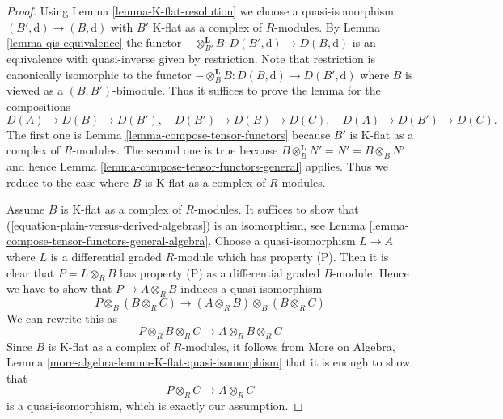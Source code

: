 \begin{proof}
Using Lemma \ref{lemma-K-flat-resolution}
we choose a quasi-isomorphism $(B', \text{d}) \to (B, \text{d})$
with $B'$ K-flat as a complex of $R$-modules.
By Lemma \ref{lemma-qis-equivalence}
the functor $-\otimes^\mathbf{L}_{B'} B : D(B', \text{d}) \to D(B, \text{d})$
is an equivalence with quasi-inverse given by restriction.
Note that restriction is canonically isomorphic to the functor
$- \otimes^\mathbf{L}_B B : D(B, \text{d}) \to D(B', \text{d})$
where $B$ is viewed as a $(B, B')$-bimodule.
Thus it suffices to prove the lemma for the compositions
$$
D(A) \to D(B) \to D(B'),\quad
D(B') \to D(B) \to D(C),\quad
D(A) \to D(B') \to D(C).
$$
The first one is Lemma \ref{lemma-compose-tensor-functors}
because $B'$ is K-flat as a complex of $R$-modules.
The second one is true because
$B \otimes_B^\mathbf{L} N' = N' = B \otimes_B N'$
and hence Lemma \ref{lemma-compose-tensor-functors-general} applies.
Thus we reduce to the case where $B$ is K-flat as a complex
of $R$-modules.

\medskip\noindent
Assume $B$ is K-flat as a complex of $R$-modules. It suffices to
show that (\ref{equation-plain-versus-derived-algebras}) is an
isomorphism, see
Lemma \ref{lemma-compose-tensor-functors-general-algebra}.
Choose a quasi-isomorphism $L \to A$ where $L$ is a differential
graded $R$-module which has property (P). Then it is clear that
$P = L \otimes_R B$ has property (P) as a differential graded $B$-module.
Hence we have to show that $P \to A \otimes_R B$
induces a quasi-isomorphism
$$
P \otimes_B (B \otimes_R C)
\longrightarrow
(A \otimes_R B) \otimes_B (B \otimes_R C)
$$
We can rewrite this as
$$
P \otimes_R B \otimes_R C \longrightarrow A \otimes_R B \otimes_R C
$$
Since $B$ is K-flat as a complex of $R$-modules, it
follows from
More on Algebra, Lemma \ref{more-algebra-lemma-K-flat-quasi-isomorphism}
that it is enough
to show that
$$
P \otimes_R C \to A \otimes_R C
$$
is a quasi-isomorphism, which is exactly our assumption.
\end{proof}











